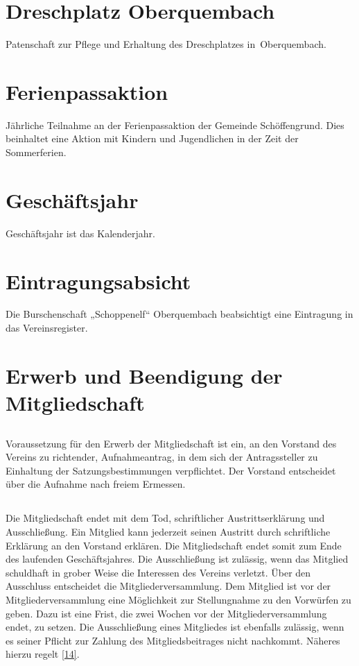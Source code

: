 \section{Dreschplatz Oberquembach}
Patenschaft zur Pflege und Erhaltung des Dreschplatzes in Oberquembach.

\section{Ferienpassaktion}
Jährliche Teilnahme an der Ferienpassaktion der Gemeinde Schöffengrund. Dies beinhaltet eine Aktion mit Kindern und Jugendlichen in der Zeit der Sommerferien.

\section{Geschäftsjahr}
Geschäftsjahr ist das Kalenderjahr.

\section{Eintragungsabsicht}
Die Burschenschaft „Schoppenelf“ Oberquembach beabsichtigt eine Eintragung in das Vereinsregister.

\section{Erwerb und Beendigung der Mitgliedschaft}
	\subsection{} Voraussetzung für den Erwerb der Mitgliedschaft ist ein, an den Vorstand des Vereins zu richtender, Aufnahmeantrag, in dem sich der Antragssteller zu Einhaltung der Satzungsbestimmungen verpflichtet. Der Vorstand entscheidet über die Aufnahme nach freiem Ermessen.
	
	\subsection{} Die Mitgliedschaft endet mit dem Tod, schriftlicher Austrittserklärung und Ausschließung. Ein Mitglied kann jederzeit seinen Austritt durch schriftliche Erklärung an den Vorstand erklären. Die Mitgliedschaft endet somit zum Ende des laufenden Geschäftsjahres. 
	Die Ausschließung ist zulässig, wenn das Mitglied schuldhaft in grober Weise die Interessen des Vereins verletzt. Über den Ausschluss entscheidet die Mitgliederversammlung. Dem Mitglied ist vor der Mitgliederversammlung eine Möglichkeit zur Stellungnahme zu den Vorwürfen zu geben. Dazu ist eine Frist, die zwei Wochen vor der Mitgliederversammlung endet, zu setzen. Die Ausschließung eines Mitgliedes ist ebenfalls zulässig, wenn es seiner Pflicht zur Zahlung des Mitgliedsbeitrages nicht nachkommt. Näheres hierzu regelt \ref{14}.
	
